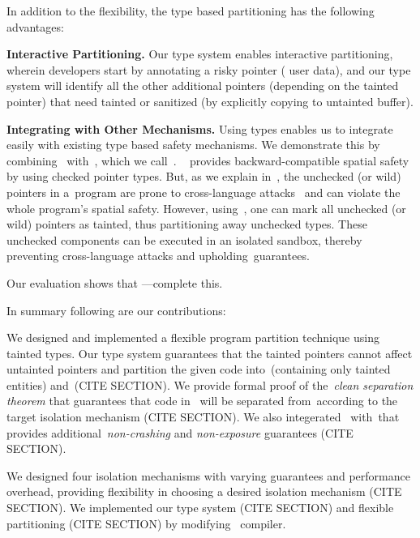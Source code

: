 In addition to the flexibility, the type based partitioning has the following advantages:

\noindent\textbf{Interactive Partitioning.} Our type system enables interactive partitioning, wherein developers start by annotating a risky pointer (\ie{} user data), and our type system will identify all the other additional pointers (depending on the tainted pointer) that need tainted or sanitized (\eg by explicitly copying to untainted buffer).

\noindent\textbf{Integrating with Other Mechanisms.} Using types enables us to integrate easily with existing type based safety mechanisms. We demonstrate this by combining~\systemname{} with~\checkedc, which we call~\ccflex.
\checkedc~\cite{Elliott2018} provides backward-compatible spatial safety by using checked pointer types. 
But, as we explain in~, the unchecked (or wild) pointers in a~\checkedc program are prone to cross-language attacks~\cite{mergendahl2022cross} and can violate the whole program's spatial safety.
However, using~\systemname{}, one can mark all unchecked (or wild) pointers as tainted, thus partitioning away unchecked types.
These unchecked components can be executed in an isolated sandbox, thereby preventing cross-language attacks and upholding~\checkedc guarantees.

Our evaluation shows that ---complete this. 

In summary following are our contributions:

We designed and implemented a flexible program partition technique using tainted types.
Our type system guarantees that the tainted pointers cannot affect untainted pointers and partition the given code into~\ucregion (containing only tainted entities) and~\cregion (CITE SECTION).
We provide formal proof of the~\emph{clean separation theorem} that guarantees that code in ~\cregion will be separated from~\ucregion according to the target isolation mechanism (CITE SECTION).
We also integerated~\systemname{} with~\checkedc that provides additional~\emph{non-crashing} and \emph{non-exposure} guarantees (CITE SECTION).

We designed four isolation mechanisms with varying guarantees and performance overhead, providing flexibility in choosing a desired isolation mechanism (CITE SECTION).
We implemented our type system (CITE SECTION) and flexible partitioning (CITE SECTION) by modifying~\clang{} compiler.


